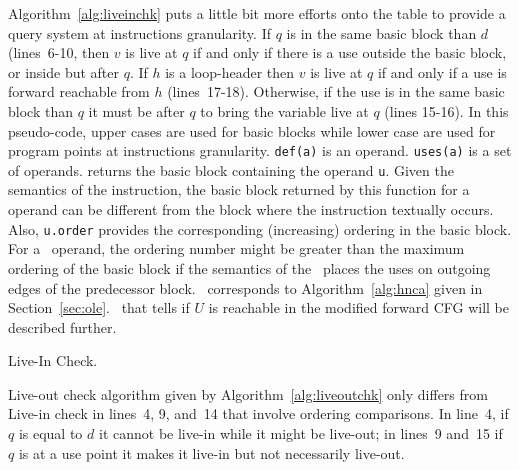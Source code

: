 Algorithm~\ref{alg:liveinchk} puts a little bit more efforts onto the table to provide a query system at instructions granularity.
If $q$ is in the same basic block than $d$ (lines~6-10, then $v$ is live at $q$ if and only if there is a use outside the basic block, or inside but after $q$.
If $h$ is a loop-header then $v$ is live at $q$ if and only if a use is forward reachable from $h$ (lines~17-18).
Otherwise, if the use is in the same basic block than $q$ it must be after $q$ to bring the variable live at $q$ (lines 15-16).
In this pseudo-code, upper cases are used for basic blocks while lower case are used for program points at instructions granularity.
\texttt{def(a)} is an operand.
\texttt{uses(a)} is a set of operands.
\texttt{} returns the basic block containing the operand \texttt{u}.
Given the semantics of the \phifun instruction, the basic block returned by this function for a \phifun operand can be different from the block where the instruction textually occurs.
Also, \texttt{u.order} provides the corresponding (increasing) ordering in the basic block.
For a \phifun\ operand, the ordering number might be greater than the maximum ordering of the basic block if the semantics of the \phifun\ places the uses on outgoing edges of the predecessor block.
\ corresponds to Algorithm~\ref{alg:hnca} given in Section~\ref{sec:ole}.
\ that tells if $U$ is reachable in the modified forward CFG will be described further.

\begin{algorithm}
\caption{Live-In Check.}
\label{alg:liveinchk}
\end{algorithm}

Live-out check algorithm given by Algorithm~\ref{alg:liveoutchk} only differs from Live-in check in lines~4, 9, and~14 that involve ordering comparisons.
In line~4, if $q$ is equal to $d$ it cannot be live-in while it might be live-out; in lines~9 and~15 if $q$ is at a use point it makes it live-in but not necessarily live-out.

